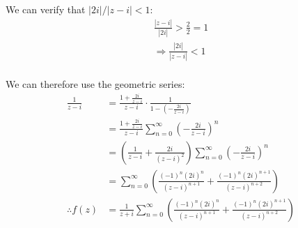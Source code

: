 \documentclass[letterpaper, titlepage, DIV=14]{scrartcl}
\begin{document}
\begin{enumerate}[i)]
\begin{enumerate}[a)]
        We can verify that $|2i|/|z-i|<1$:
        \begin{gather*}
          \frac{|z-i|}{|2i|} > \frac{2}{2} = 1 \\
          \Rightarrow \frac{|2i|}{|z-i|} <  1 \\
        \end{gather*}

        We can therefore use the geometric series:
        \begin{align*}
          \frac{1}{z-i} &= \frac{1 + \frac{2i}{z-i}}{z-i} \cdot \frac{1}{1-(-\frac{2i}{z-i})} \\
            &= \frac{1 + \frac{2i}{z-i}}{z-i} \sum_{n=0}^{\infty}(-\frac{2i}{z-i})^{n} \\
            &= (\frac{1}{z-i} + \frac{2i}{(z-i)^{2}}) \sum_{n=0}^{\infty}(-\frac{2i}{z-i})^{n} \\
            &= \sum_{n=0}^{\infty}(\frac{(-1)^{n}(2i)^{n}}{(z-i)^{n+1}} + \frac{(-1)^{n}(2i)^{n+1}}{(z-i)^{n+2}}) \\
          \therefore f(z) &= \frac{1}{z+i}\sum_{n=0}^{\infty}(\frac{(-1)^{n}(2i)^{n}}{(z-i)^{n+1}} + \frac{(-1)^{n}(2i)^{n+1}}{(z-i)^{n+2}})
        \end{align*}
      \end{enumerate}
    \end{enumerate}
    
\end{document}
